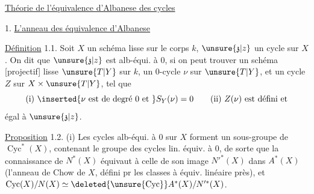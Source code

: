 
\uline{Théorie de l'équivalence d'Albanese des cycles}

1. \uline{L'anneau des équivalence d'Albanese}

\uline{Définition} 1.1. Soit $X$ un schéma \deleted{[projectif]} lisse sur le corps $k$, $\unsure{\mathfrak z|z}$ un cycle sur $X$. On dit que $\unsure{\mathfrak z|z}$ est alb-équi. à $0$, si on peut trouver un schéma [projectif] lisse   $\unsure{T|Y}$ sur $k$,  un $0$-cycle  $\nu$ sur $\unsure{T|Y}$, et un cycle $Z$ sur $X\times\unsure{T|Y}$, tel que
\[
\text{(i) }\inserted{\nu\text{ est de degré }0\text{ et }}S_Y(\nu)=0\qquad\text{(ii) }Z(\nu)\text{ est défini et}
\]
égal à $\unsure{\mathfrak z|z}$.


\uline{Proposition} 1.2. (i) Les cycles alb-équi. à $0$ sur $X$ forment un sous-groupe  de $\operatorname{Cyc}^*(X)$, contenant le groupe des cycles lin. équiv. à $0$, de sorte que la connaissance de $N^*(X)$ équivaut à celle de son image $N'^*(X)$ dans  $A^*(X)$ (l'anneau de Chow de $X$, défini pr les classes à équiv. linéaire près), et $\operatorname{Cyc}(X)/N(X)\simeq\deleted{\unsure{\operatorname{Cyc}}}A^*(X)/N'^*(X)$.

